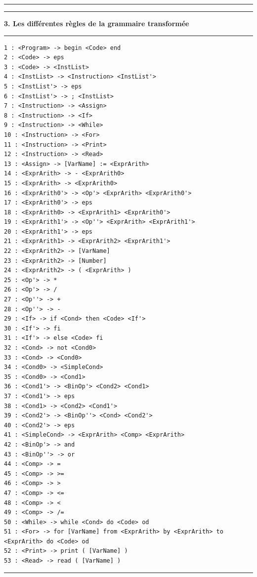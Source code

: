 \documentclass[pdftex,10pt,a4paper]{article}
\begin{document}
\noindent\rule[0.5ex]{\linewidth}{1pt}

\noindent\rule[0.5ex]{\linewidth}{1pt}
\textbf{3. Les différentes règles de la grammaire transformée}\\
\noindent\rule[0.5ex]{\linewidth}{1pt}

\begin{verbatim}
1 : <Program> -> begin <Code> end 
2 : <Code> -> eps 
3 : <Code> -> <InstList> 
4 : <InstList> -> <Instruction> <InstList'> 
5 : <InstList'> -> eps 
6 : <InstList'> -> ; <InstList> 
7 : <Instruction> -> <Assign> 
8 : <Instruction> -> <If> 
9 : <Instruction> -> <While> 
10 : <Instruction> -> <For> 
11 : <Instruction> -> <Print> 
12 : <Instruction> -> <Read> 
13 : <Assign> -> [VarName] := <ExprArith> 
14 : <ExprArith> -> - <ExprArith0> 
15 : <ExprArith> -> <ExprArith0> 
16 : <ExprArith0'> -> <Op'> <ExprArith> <ExprArith0'> 
17 : <ExprArith0'> -> eps 
18 : <ExprArith0> -> <ExprArith1> <ExprArith0'> 
19 : <ExprArith1'> -> <Op''> <ExprArith> <ExprArith1'> 
20 : <ExprArith1'> -> eps 
21 : <ExprArith1> -> <ExprArith2> <ExprArith1'> 
22 : <ExprArith2> -> [VarName] 
23 : <ExprArith2> -> [Number] 
24 : <ExprArith2> -> ( <ExprArith> ) 
25 : <Op'> -> * 
26 : <Op'> -> / 
27 : <Op''> -> + 
28 : <Op''> -> - 
29 : <If> -> if <Cond> then <Code> <If'> 
30 : <If'> -> fi 
31 : <If'> -> else <Code> fi 
32 : <Cond> -> not <Cond0> 
33 : <Cond> -> <Cond0> 
34 : <Cond0> -> <SimpleCond> 
35 : <Cond0> -> <Cond1> 
36 : <Cond1'> -> <BinOp'> <Cond2> <Cond1> 
37 : <Cond1'> -> eps 
38 : <Cond1> -> <Cond2> <Cond1'> 
39 : <Cond2'> -> <BinOp''> <Cond> <Cond2'> 
40 : <Cond2'> -> eps 
41 : <SimpleCond> -> <ExprArith> <Comp> <ExprArith> 
42 : <BinOp'> -> and 
43 : <BinOp''> -> or 
44 : <Comp> -> = 
45 : <Comp> -> >= 
46 : <Comp> -> > 
47 : <Comp> -> <= 
48 : <Comp> -> < 
49 : <Comp> -> /= 
50 : <While> -> while <Cond> do <Code> od 
51 : <For> -> for [VarName] from <ExprArith> by <ExprArith> to <ExprArith> do <Code> od 
52 : <Print> -> print ( [VarName] ) 
53 : <Read> -> read ( [VarName] ) 
\end{verbatim}
\noindent\rule[0.5ex]{\linewidth}{1pt}
\end{document}
